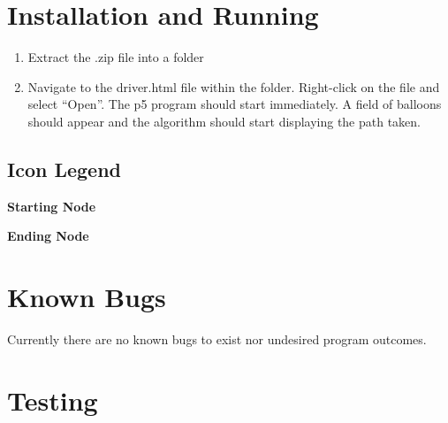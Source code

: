 \documentclass{article}
\begin{document}
\newpage

\section{Installation and Running}

\begin{enumerate}
\item Extract the .zip file into a folder
\item Navigate to the driver.html file within the folder. Right-click on the file and select “Open”. The p5 program should start immediately. A field of balloons should appear and the algorithm should start displaying the path taken.
\end{enumerate}

\subsection{Icon Legend}

\begin{center}
\large \textbf{Starting Node}


\end{center}

\vspace*{7px}

\begin{center}
\large \textbf{Ending Node}


\end{center}

\section{Known Bugs}

Currently there are no known bugs to exist nor undesired program outcomes.

\section{Testing}
\end{document}
